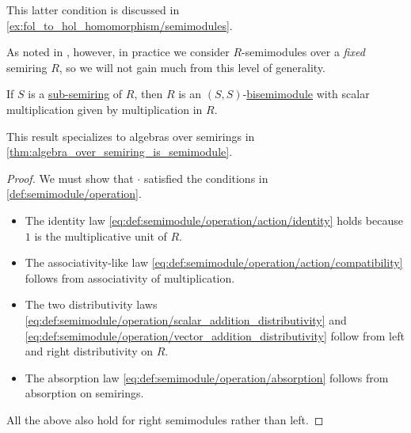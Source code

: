 \begin{remark}
  This latter condition is discussed in \cref{ex:fol_to_hol_homomorphism/semimodules}.

  As noted in \cite{MathSE:many_sorted_fol_theory_for_vector_spaces}, however, in practice we consider \( R \)-semimodules over a \emph{fixed} semiring \( R \), so we will not gain much from this level of generality.
\end{remark}

\begin{proposition}\label{thm:bisemimodule_over_subsemiring}
  If \( S \) is a \hyperref[def:semiring/subobject]{sub-semiring} of \( R \), then \( R \) is an \( (S, S) \)-\hyperref[def:semimodule/bisemimodule]{bisemimodule} with scalar multiplication given by multiplication in \( R \).
\end{proposition}
\begin{comments}
  \item This result specializes to algebras over semirings in \cref{thm:algebra_over_semiring_is_semimodule}.
\end{comments}
\begin{proof}
  We must show that \( \cdot \) satisfied the conditions in \cref{def:semimodule/operation}.
  \begin{itemize}
    \item The identity law \eqref{eq:def:semimodule/operation/action/identity} holds because \( 1 \) is the multiplicative unit of \( R \).
    \item The associativity-like law \eqref{eq:def:semimodule/operation/action/compatibility} follows from associativity of multiplication.
    \item The two distributivity laws \eqref{eq:def:semimodule/operation/scalar_addition_distributivity} and \eqref{eq:def:semimodule/operation/vector_addition_distributivity} follow from left and right distributivity on \( R \).
    \item The absorption law \eqref{eq:def:semimodule/operation/absorption} follows from absorption on semirings.
  \end{itemize}

  All the above also hold for right semimodules rather than left.
\end{proof}

